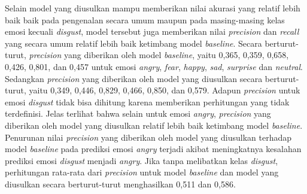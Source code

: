 Selain model yang diusulkan mampu memberikan nilai akurasi yang relatif lebih baik baik pada pengenalan secara umum maupun pada masing-masing kelas emosi kecuali \textit{disgust}, model tersebut juga memberikan nilai \textit{precision} dan \textit{recall} yang secara umum relatif lebih baik ketimbang model \textit{baseline}. Secara berturut-turut, \textit{precision} yang diberikan oleh model \textit{baseline}, yaitu 0,365, 0,359, 0,658, 0,426, 0,801, dan 0,457 untuk emosi \textit{angry}, \textit{fear}, \textit{happy}, \textit{sad}, \textit{surprise} dan \textit{neutral}. Sedangkan \textit{precision} yang diberikan oleh model yang diusulkan secara berturut-turut, yaitu 0,349, 0,446, 0,829, 0,466, 0,850, dan 0,579. Adapun \textit{precision} untuk emosi \textit{disgust} tidak bisa dihitung karena memberikan perhitungan yang tidak terdefinisi. Jelas terlihat bahwa selain untuk emosi \textit{angry}, \textit{precision} yang diberikan oleh model yang diusulkan relatif lebih baik ketimbang model \textit{baseline}. Penurunan nilai \textit{precision} yang diberikan oleh model yang diusulkan terhadap model \textit{baseline} pada prediksi emosi \textit{angry} terjadi akibat meningkatnya kesalahan prediksi emosi \textit{disgust} menjadi \textit{angry}. Jika tanpa melibatkan kelas \textit{disgust}, perhitungan rata-rata dari \textit{precision} untuk model \textit{baseline} dan model yang diusulkan secara berturut-turut menghasilkan 0,511 dan 0,586.

